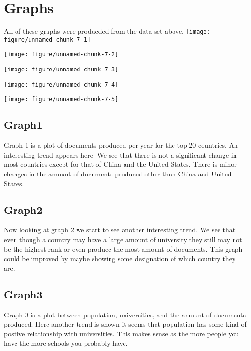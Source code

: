 \documentclass{article}\usepackage[]{graphicx}\usepackage[]{color}
\makeatletter
\def\maxwidth{ %
  \ifdim\Gin@nat@width>\linewidth
    \linewidth
  \else
    \Gin@nat@width
  \fi
}
\newenvironment{kframe}{%
 \def\at@end@of@kframe{}%
 \ifinner\ifhmode%
  \def\at@end@of@kframe{\end{minipage}}%
  \begin{minipage}{\columnwidth}%
 \fi\fi%
 \def\FrameCommand##1{\hskip\@totalleftmargin \hskip-\fboxsep
 \colorbox{shadecolor}{##1}\hskip-\fboxsep
     \hskip-\linewidth \hskip-\@totalleftmargin \hskip\columnwidth}%
 \MakeFramed {\advance\hsize-\width
   \@totalleftmargin\z@ \linewidth\hsize
   \@setminipage}}%
 {\par\unskip\endMakeFramed%
 \at@end@of@kframe}
\newenvironment{knitrout}{}{} %
\makeatother
\begin{document}
\section{Graphs}
All of these graphs were producded from the data set above.
\begin{knitrout}
\color{fgcolor}
\texttt{[image: figure/unnamed-chunk-7-1]} 
\begin{kframe}

{\ttfamily\noindent\color{warningcolor}{\#\# Warning: Removed 42966 rows containing missing\\\#\# values (geom\_point).}}\end{kframe}
\texttt{[image: figure/unnamed-chunk-7-2]} 

\texttt{[image: figure/unnamed-chunk-7-3]} 
\begin{kframe}

{\ttfamily\noindent\color{warningcolor}{\#\# Warning: Removed 441 rows containing missing values (geom\_path).}}\end{kframe}
\texttt{[image: figure/unnamed-chunk-7-4]} 

\texttt{[image: figure/unnamed-chunk-7-5]} 

\end{knitrout}

\subsection{Graph1}
Graph 1 is a plot of documents produced per year for the top 20 countries. An interesting trend appears here. We see that there is not a significant change in most countries except for that of China and the United States. There is minor changes in the amount of documents produced other than China and United States. 
\subsection{Graph2}
Now looking at graph 2 we start to see another interesting trend. We see that even though a country may have a large amount of university they still may not be the highest rank or even produce the most amount of documents. This graph could be improved by maybe showing some designation of which country they are. 
\subsection{Graph3}
Graph 3 is a plot between population, universities, and the amount of documents produced. Here another trend is shown it seems that population has some kind of postive relationship with universities. This makes sense as the more people you have the more schools you probably have.
\end{document}
